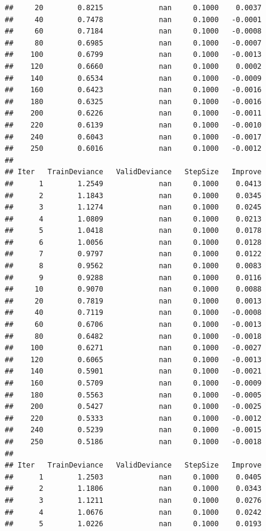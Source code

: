 \documentclass[]{book}
\begin{document}
\begin{verbatim}
##     20        0.8215             nan     0.1000    0.0037
##     40        0.7478             nan     0.1000   -0.0001
##     60        0.7184             nan     0.1000   -0.0008
##     80        0.6985             nan     0.1000   -0.0007
##    100        0.6799             nan     0.1000   -0.0013
##    120        0.6660             nan     0.1000    0.0002
##    140        0.6534             nan     0.1000   -0.0009
##    160        0.6423             nan     0.1000   -0.0016
##    180        0.6325             nan     0.1000   -0.0016
##    200        0.6226             nan     0.1000   -0.0011
##    220        0.6139             nan     0.1000   -0.0010
##    240        0.6043             nan     0.1000   -0.0017
##    250        0.6016             nan     0.1000   -0.0012
## 
## Iter   TrainDeviance   ValidDeviance   StepSize   Improve
##      1        1.2549             nan     0.1000    0.0413
##      2        1.1843             nan     0.1000    0.0345
##      3        1.1274             nan     0.1000    0.0245
##      4        1.0809             nan     0.1000    0.0213
##      5        1.0418             nan     0.1000    0.0178
##      6        1.0056             nan     0.1000    0.0128
##      7        0.9797             nan     0.1000    0.0122
##      8        0.9562             nan     0.1000    0.0083
##      9        0.9288             nan     0.1000    0.0116
##     10        0.9070             nan     0.1000    0.0088
##     20        0.7819             nan     0.1000    0.0013
##     40        0.7119             nan     0.1000   -0.0008
##     60        0.6706             nan     0.1000   -0.0013
##     80        0.6482             nan     0.1000   -0.0018
##    100        0.6271             nan     0.1000   -0.0027
##    120        0.6065             nan     0.1000   -0.0013
##    140        0.5901             nan     0.1000   -0.0021
##    160        0.5709             nan     0.1000   -0.0009
##    180        0.5563             nan     0.1000   -0.0005
##    200        0.5427             nan     0.1000   -0.0025
##    220        0.5333             nan     0.1000   -0.0012
##    240        0.5239             nan     0.1000   -0.0015
##    250        0.5186             nan     0.1000   -0.0018
## 
## Iter   TrainDeviance   ValidDeviance   StepSize   Improve
##      1        1.2503             nan     0.1000    0.0405
##      2        1.1806             nan     0.1000    0.0343
##      3        1.1211             nan     0.1000    0.0276
##      4        1.0676             nan     0.1000    0.0242
##      5        1.0226             nan     0.1000    0.0193

\end{verbatim}
\end{document}
